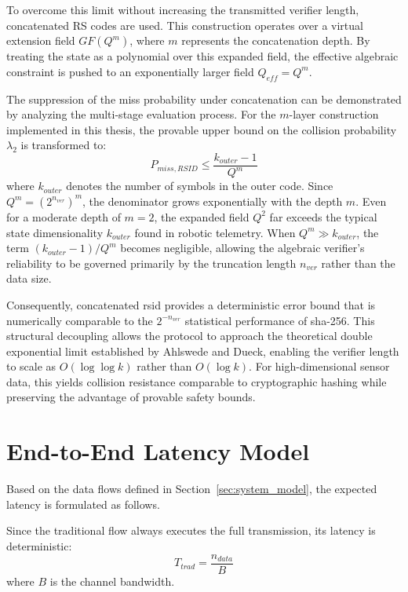 To overcome this limit without increasing the transmitted verifier length, concatenated RS codes are used. This construction operates over a virtual extension field $GF(Q^{m})$, where $m$ represents the concatenation depth. By treating the state as a polynomial over this expanded field, the effective algebraic constraint is pushed to an exponentially larger field $Q_{eff} = Q^m$. 

The suppression of the miss probability under concatenation can be demonstrated by analyzing the multi-stage evaluation process. For the $m$-layer construction implemented in this thesis, the provable upper bound on the collision probability $\lambda_2$ is transformed to:
\begin{equation}
    P_{miss, RSID} \le \frac{k_{outer}-1}{Q^{m}}
\end{equation}
where $k_{outer}$ denotes the number of symbols in the outer code. Since $Q^m = (2^{n_{ver}})^m$, the denominator grows exponentially with the depth $m$. Even for a moderate depth of $m=2$, the expanded field $Q^2$ far exceeds the typical state dimensionality $k_{outer}$ found in robotic telemetry. When $Q^m \gg k_{outer}$, the term $(k_{outer}-1)/Q^m$ becomes negligible, allowing the algebraic verifier's reliability to be governed primarily by the truncation length $n_{ver}$ rather than the data size. 

Consequently, concatenated \gls{rsid} provides a deterministic error bound that is numerically comparable to the $2^{-n_{ver}}$ statistical performance of \gls{sha}-256. This structural decoupling allows the protocol to approach the theoretical double exponential limit established by Ahlswede and Dueck, enabling the verifier length to scale as $O(\log \log k)$ rather than $O(\log k)$. For high-dimensional sensor data, this yields collision resistance comparable to cryptographic hashing while preserving the advantage of provable safety bounds.

\section{End-to-End Latency Model}
\label{sec:latency_model}

Based on the data flows defined in Section~\ref{sec:system_model}, the expected latency is formulated as follows.

Since the traditional flow always executes the full transmission, its latency is deterministic:
\begin{equation}
    T_{trad} = \frac{n_{data}}{B}
\end{equation}
where $B$ is the channel bandwidth.

